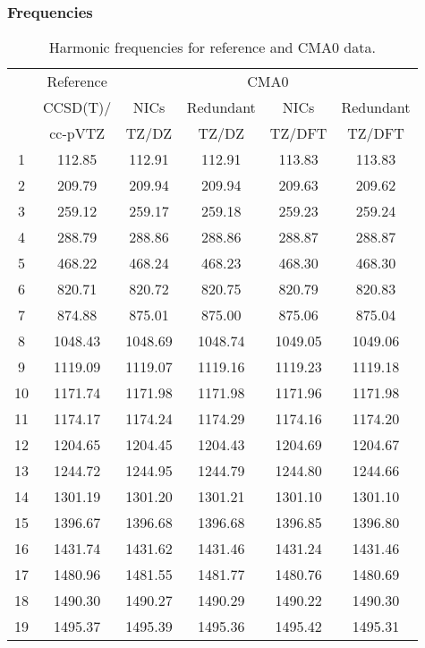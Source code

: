 \documentclass[10pt,oneside]{article}
\begin{document}
\begin{table}[h!]
\subsubsection*{Frequencies}
\centering
\caption{Harmonic frequencies for reference and CMA0 data.}
\begin{tabular}{cccccc}
\toprule
{} & Reference & \multicolumn{4}{c}{CMA0} \\
{} &  CCSD(T)/ &    NICs &  Redundant &    NICs & Redundant \\
{} &   cc-pVTZ &   TZ/DZ &      TZ/DZ &  TZ/DFT &    TZ/DFT \\
\midrule
1  &    112.85 &  112.91 &     112.91 &  113.83 &    113.83 \\
2  &    209.79 &  209.94 &     209.94 &  209.63 &    209.62 \\
3  &    259.12 &  259.17 &     259.18 &  259.23 &    259.24 \\
4  &    288.79 &  288.86 &     288.86 &  288.87 &    288.87 \\
5  &    468.22 &  468.24 &     468.23 &  468.30 &    468.30 \\
6  &    820.71 &  820.72 &     820.75 &  820.79 &    820.83 \\
7  &    874.88 &  875.01 &     875.00 &  875.06 &    875.04 \\
8  &   1048.43 & 1048.69 &    1048.74 & 1049.05 &   1049.06 \\
9  &   1119.09 & 1119.07 &    1119.16 & 1119.23 &   1119.18 \\
10 &   1171.74 & 1171.98 &    1171.98 & 1171.96 &   1171.98 \\
11 &   1174.17 & 1174.24 &    1174.29 & 1174.16 &   1174.20 \\
12 &   1204.65 & 1204.45 &    1204.43 & 1204.69 &   1204.67 \\
13 &   1244.72 & 1244.95 &    1244.79 & 1244.80 &   1244.66 \\
14 &   1301.19 & 1301.20 &    1301.21 & 1301.10 &   1301.10 \\
15 &   1396.67 & 1396.68 &    1396.68 & 1396.85 &   1396.80 \\
16 &   1431.74 & 1431.62 &    1431.46 & 1431.24 &   1431.46 \\
17 &   1480.96 & 1481.55 &    1481.77 & 1480.76 &   1480.69 \\
18 &   1490.30 & 1490.27 &    1490.29 & 1490.22 &   1490.30 \\
19 &   1495.37 & 1495.39 &    1495.36 & 1495.42 &   1495.31 \\

\end{tabular}
\end{table}
\end{document}
